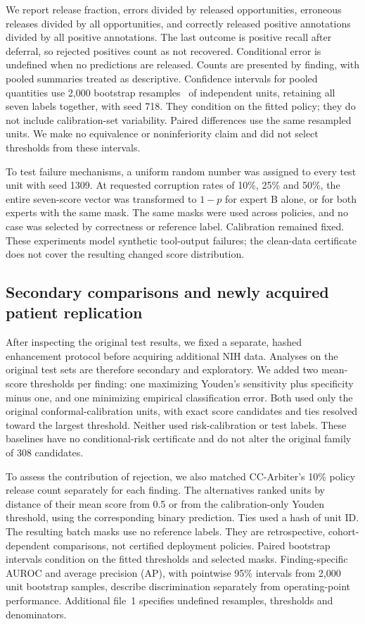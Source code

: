 \documentclass[10pt,a4paper]{article}
\begin{document}
We report release fraction, errors divided by released opportunities, erroneous releases divided by all opportunities, and correctly released positive annotations divided by all positive annotations. The last outcome is positive recall after deferral, so rejected positives count as not recovered. Conditional error is undefined when no predictions are released. Counts are presented by finding, with pooled summaries treated as descriptive. Confidence intervals for pooled quantities use 2,000 bootstrap resamples~\cite{efron1979bootstrap} of independent units, retaining all seven labels together, with seed 718. They condition on the fitted policy; they do not include calibration-set variability. Paired differences use the same resampled units. We make no equivalence or noninferiority claim and did not select thresholds from these intervals.

To test failure mechanisms, a uniform random number was assigned to every test unit with seed 1309. At requested corruption rates of 10\%, 25\% and 50\%, the entire seven-score vector was transformed to $1-p$ for expert B alone, or for both experts with the same mask. The same masks were used across policies, and no case was selected by correctness or reference label. Calibration remained fixed. These experiments model synthetic tool-output failures; the clean-data certificate does not cover the resulting changed score distribution.

\subsection{Secondary comparisons and newly acquired patient replication}
After inspecting the original test results, we fixed a separate, hashed enhancement protocol before acquiring additional NIH data. Analyses on the original test sets are therefore secondary and exploratory. We added two mean-score thresholds per finding: one maximizing Youden's sensitivity plus specificity minus one, and one minimizing empirical classification error. Both used only the original conformal-calibration units, with exact score candidates and ties resolved toward the largest threshold. Neither used risk-calibration or test labels. These baselines have no conditional-risk certificate and do not alter the original family of 308 candidates.

To assess the contribution of rejection, we also matched CC-Arbiter's 10\% policy release count separately for each finding. The alternatives ranked units by distance of their mean score from 0.5 or from the calibration-only Youden threshold, using the corresponding binary prediction. Ties used a hash of unit ID. The resulting batch masks use no reference labels. They are retrospective, cohort-dependent comparisons, not certified deployment policies. Paired bootstrap intervals condition on the fitted thresholds and selected masks. Finding-specific AUROC and average precision (AP), with pointwise 95\% intervals from 2,000 unit bootstrap samples, describe discrimination separately from operating-point performance. Additional file~1 specifies undefined resamples, thresholds and denominators.
\end{document}

